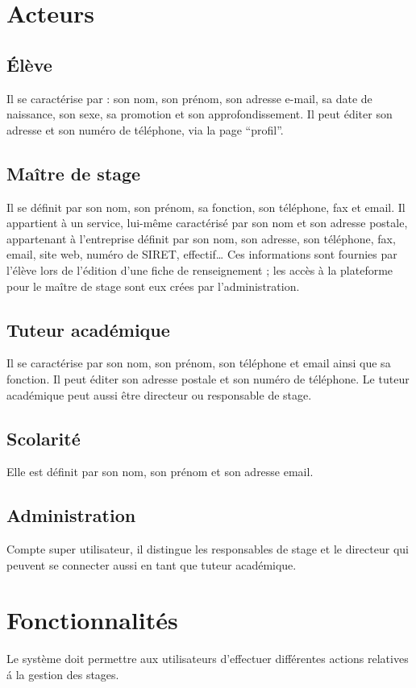 \documentclass{scrreprt}
\begin{document}
\section{Acteurs}
\subsection{\'El\`eve}
Il se caract\'erise par : son nom, son pr\'enom, son adresse e-mail, sa date de naissance, son sexe, sa promotion et son approfondissement. Il peut \'editer son adresse et son num\'ero de t\'el\'ephone, via la page “profil”.

\subsection{Ma\^itre de stage}
Il se d\'efinit par son nom, son pr\'enom, sa fonction, son t\'el\'ephone, fax et email. Il appartient \`a un service, lui-m\^eme caract\'eris\'e par son nom et son adresse postale, appartenant à l’entreprise définit par son nom, son adresse, son t\'el\'ephone, fax, email, site web,  num\'ero de SIRET, effectif… Ces informations sont fournies par l’\'el\`eve lors de l’\'edition d’une fiche de renseignement ; les acc\`es \`a la plateforme pour le ma\^itre de stage sont eux cr\'ees par l’administration.

\subsection{Tuteur acad\'emique}
Il se caract\'erise par son nom, son pr\'enom, son t\'el\'ephone et email ainsi que sa fonction. Il peut \'editer son adresse postale et son num\'ero de t\'el\'ephone.
Le tuteur acad\'emique peut aussi \^etre directeur ou responsable de stage.

\subsection{Scolarit\'e}
Elle est d\'efinit par son nom, son pr\'enom et son adresse email.

\subsection{Administration}
Compte super utilisateur, il distingue les responsables de stage et le directeur qui peuvent se connecter aussi en tant que tuteur acad\'emique.

\section{Fonctionnalit\'es}
Le syst\`eme doit permettre aux utilisateurs d’effectuer diff\'erentes actions relatives \'a la gestion des stages.
\end{document}
